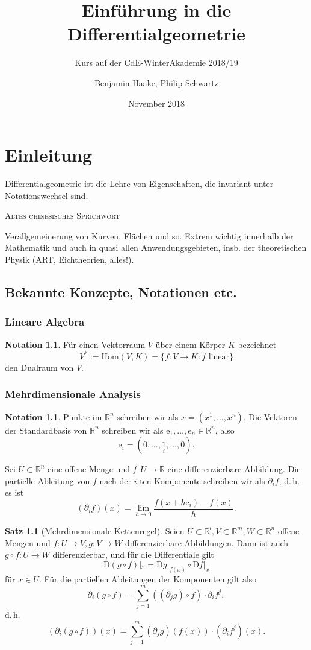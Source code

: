 \documentclass[a4paper]{scrreprt}
\title{Einführung in die Differentialgeometrie}
\subtitle{Kurs auf der CdE-WinterAkademie 2018/19}
\author{Benjamin Haake, Philip Schwartz}
\date{November 2018}
\numberwithin{equation}{chapter}
\newcommand{\DD}{\mathrm{D}}
\newcommand{\e}{\mathrm{e}}
\theoremstyle{definition}
\newtheorem{satz}[defn]{Satz}
\newtheorem{nota}[defn]{Notation}
\begin{document}
\maketitle

\setcounter{chapter}{-1}
\chapter{Einleitung}
\epigraph{Differentialgeometrie ist die Lehre von Eigenschaften, die invariant unter Notationswechsel sind.}{\textsc{Altes chinesisches Sprichwort}}

Verallgemeinerung von Kurven, Flächen und so. Extrem wichtig innerhalb der Mathematik und auch in quasi allen Anwendungsgebieten, insb. der theoretischen Physik (ART, Eichtheorien, alles!).

\section{Bekannte Konzepte, Notationen etc.}

\subsection{Lineare Algebra}

\begin{nota}
	Für einen Vektorraum $V$ über einem Körper $K$ bezeichnet \[V^* := \mathrm{Hom}(V,K) = \{f\colon V \to K : f \text{ linear}\}\] den Dualraum von $V$.
\end{nota}

\subsection{Mehrdimensionale Analysis}
\begin{nota}
	Punkte im $\mathbb R^n$ schreiben wir als $x = (x^1, \dots, x^n)$. Die Vektoren der Standardbasis von $\mathbb R^n$ schreiben wir als $\e_1, \dots, \e_n \in \mathbb R^n$, also \[\e_i = (0,\dots,\underset{i}{1},\dots,0).\]

	Sei $U \subset \mathbb R^n$ eine offene Menge und $f\colon U \to \mathbb R$ eine differenzierbare Abbildung. Die partielle Ableitung von $f$ nach der $i$-ten Komponente schreiben wir als $\partial_i f$, d.\,h. es ist
	\[(\partial_i f)(x) = \lim_{h\to 0} \frac{f(x + h \e_i) - f(x)}{h}.\]
\end{nota}

\begin{satz}[Mehrdimensionale Kettenregel]
	Seien $U \subset \mathbb R^l, V \subset \mathbb R^m, W \subset \mathbb R^n$ offene Mengen und $f\colon U\to V, g\colon V \to W$ differenzierbare Abbildungen. Dann ist auch $g\circ f\colon U \to W$ differenzierbar, und für die Differentiale gilt
	\[\DD(g\circ f)|_x = \DD g|_{f(x)} \circ \DD f|_x\]
	für $x \in U$. Für die partiellen Ableitungen der Komponenten gilt also
	\[\partial_i(g\circ f) = \sum_{j = 1}^m ((\partial_j g)\circ f) \cdot \partial_i f^j,\]
	d.\,h.
	\[(\partial_i(g\circ f))(x) = \sum_{j = 1}^m (\partial_j g)(f(x)) \cdot (\partial_i f^j)(x).\]
\end{satz}
\end{document}
